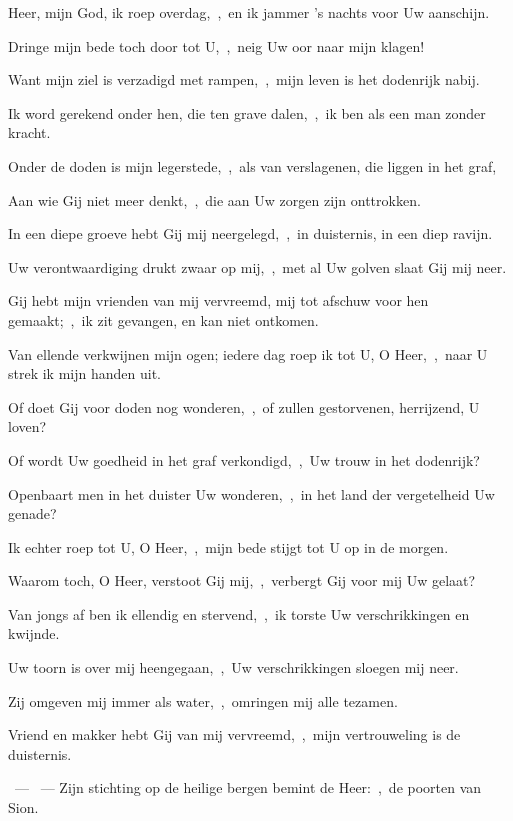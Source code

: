 \documentclass[12pt,twoside,a5paper]{article}
\begin{document}
\begin{halfparskip}
   Heer, mijn God, ik roep overdag,~\sep\ en ik jammer 's nachts voor Uw aanschijn.

  Dringe mijn bede toch door tot U,~\sep\ neig Uw oor naar mijn klagen!

  Want mijn ziel is verzadigd met rampen,~\sep\ mijn leven is het dodenrijk nabij.

  Ik word gerekend onder hen, die ten grave dalen,~\sep\ ik ben als een man zonder kracht.

  Onder de doden is mijn legerstede,~\sep\ als van verslagenen, die liggen in het graf,

  Aan wie Gij niet meer denkt,~\sep\ die aan Uw zorgen zijn onttrokken.

  In een diepe groeve hebt Gij mij neergelegd,~\sep\ in duisternis, in een diep ravijn.

  Uw verontwaardiging drukt zwaar op mij,~\sep\ met al Uw golven slaat Gij mij neer.

  Gij hebt mijn vrienden van mij vervreemd, mij tot afschuw voor hen gemaakt;~\sep\ ik zit gevangen, en kan niet ontkomen.

  Van ellende verkwijnen mijn ogen; iedere dag roep ik tot U, O Heer,~\sep\ naar U strek ik mijn handen uit.

  Of doet Gij voor doden nog wonderen,~\sep\ of zullen gestorvenen, herrijzend, U loven?

  Of wordt Uw goedheid in het graf verkondigd,~\sep\ Uw trouw in het dodenrijk?

  Openbaart men in het duister Uw wonderen,~\sep\ in het land der vergetelheid Uw genade?

  Ik echter roep tot U, O Heer,~\sep\ mijn bede stijgt tot U op in de morgen.

  Waarom toch, O Heer, verstoot Gij mij,~\sep\ verbergt Gij voor mij Uw gelaat?

  Van jongs af ben ik ellendig en stervend,~\sep\ ik torste Uw verschrikkingen en kwijnde.

  Uw toorn is over mij heengegaan,~\sep\ Uw verschrikkingen sloegen mij neer.

  Zij omgeven mij immer als water,~\sep\ omringen mij alle tezamen.

  Vriend en makker hebt Gij van mij vervreemd,~\sep\ mijn vertrouweling is de duisternis.

  ~--- ~--- Zijn stichting op de heilige bergen bemint de Heer:~\sep\ de poorten van Sion.
\end{halfparskip}
\end{document}
